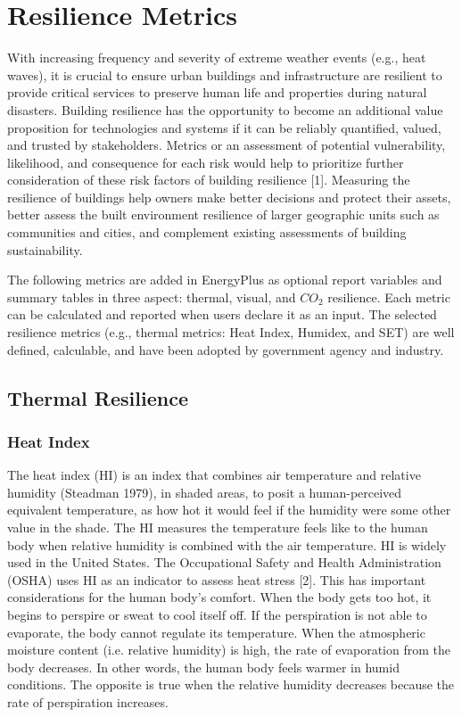 \section{Resilience Metrics}\label{resilience-metrics}

With increasing frequency and severity of extreme weather events (e.g., heat waves), it is crucial to ensure urban buildings and infrastructure are resilient to provide critical services to preserve human life and properties during natural disasters. Building resilience has the opportunity to become an additional value proposition for technologies and systems if it can be reliably quantified, valued, and trusted by stakeholders. Metrics or an assessment of potential vulnerability, likelihood, and consequence for each risk would help to prioritize further consideration of these risk factors of building resilience [1]. Measuring the resilience of buildings help owners make better decisions and protect their assets, better assess the built environment resilience of larger geographic units such as communities and cities, and complement existing assessments of building sustainability. 

The following metrics are added in EnergyPlus as optional report variables and summary tables in three aspect: thermal, visual, and $CO_{2}$ resilience. Each metric can be calculated and reported when users declare it as an input. The selected resilience metrics (e.g., thermal metrics: Heat Index, Humidex, and SET) are well defined, calculable, and have been adopted by government agency and industry.

\subsection{Thermal Resilience}\label{thermal-resilience}

\subsubsection{Heat Index}\label{heat-index}

The heat index (HI) is an index that combines air temperature and relative humidity (Steadman 1979), in shaded areas, to posit a human-perceived equivalent temperature, as how hot it would feel if the humidity were some other value in the shade. The HI measures the temperature feels like to the human body when relative humidity is combined with the air temperature. HI is widely used in the United States. The Occupational Safety and Health Administration (OSHA) uses HI as an indicator to assess heat stress [2]. This has important considerations for the human body's comfort.  When the body gets too hot, it begins to perspire or sweat to cool itself off.  If the perspiration is not able to evaporate, the body cannot regulate its temperature. When the atmospheric moisture content (i.e. relative humidity) is high, the rate of evaporation from the body decreases.  In other words, the human body feels warmer in humid conditions.  The opposite is true when the relative humidity decreases because the rate of perspiration increases.  


